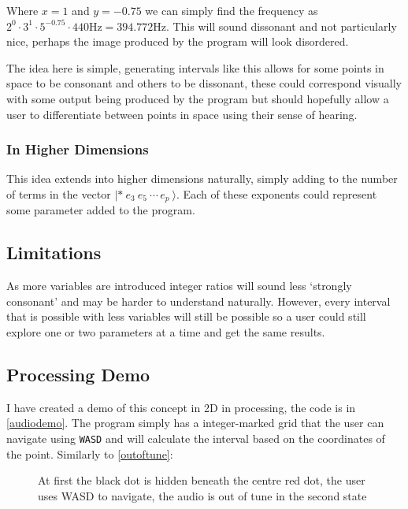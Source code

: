 Where $x=1$ and $y=-0.75$ we can simply find the frequency as $2^0 \cdot 3^1
\cdot 5^{-0.75} \cdot 440\si{\hertz} = 394.772\si{\hertz}$. This will sound
dissonant and not particularly nice, perhaps the image produced by the program
will look disordered.

The idea here is simple, generating intervals like this allows for some points
in space to be consonant and others to be dissonant, these could correspond
visually with some output being produced by the program but should hopefully
allow a user to differentiate between points in space using their sense of
hearing.

\subsubsection{In Higher Dimensions}
This idea extends into higher dimensions naturally, simply adding to the number
of terms in the vector $|*\ e_3\ e_5\ \cdots\, e_p\  \rangle$. Each of these
exponents could represent some parameter added to the program. 

\subsection{Limitations}
As more variables are introduced integer ratios will sound less `strongly
consonant' and may be harder to understand naturally. However, every interval
that is possible with less variables will still be possible so a user could
still explore one or two parameters at a time and get the same results.

\subsection{Processing Demo}
I have created a demo of this concept in 2D in processing, the code is in
\autoref{audiodemo}. The program simply has a integer-marked grid that the user
can navigate using \verb|WASD| and will calculate the interval based on the
coordinates of the point. Similarly to \autoref{outoftune}:

\begin{figure}[h!]
\centering
{}%
\hspace*{2cm}%
\caption{At first the black dot is hidden beneath the centre red dot, the user uses WASD to navigate,
the audio is out of tune in the second state}
\end{figure}

